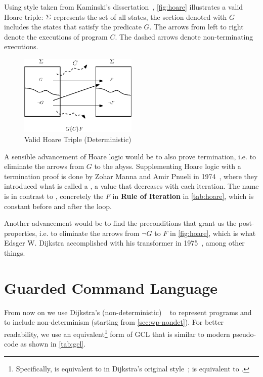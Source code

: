Using style taken from Kaminski's dissertation~\cite{kaminski19}, \autoref{fig:hoare} illustrates a valid Hoare triple: $\S$ represents the set of all states, the section denoted with $G$ includes the states that satisfy the predicate $G$. 
The arrows from left to right denote the executions of program $C$. 
The dashed arrows denote non-terminating executions. 

\begin{figure}[ht]\centering
\includegraphics[width=0.5\textwidth]{image/hoare.eps}
\caption{Valid Hoare Triple (Deterministic)}
\label{fig:hoare}
\end{figure}


A sensible advancement of Hoare logic would be to also prove termination, i.e. to eliminate the arrows from $G$ to the abyss.  
Supplementing Hoare logic with a termination proof is done by Zohar Manna and Amir Pnueli in 1974~\cite{manna74}, where they introduced what is called a , a value that decreases with each iteration. The name is in contrast to , concretely the $F$ in \textbf{Rule of Iteration} in \autoref{tab:hoare}, which is constant before and after the loop. 

Another advancement would be to find the  preconditions that grant us the post-properties, i.e. to eliminate the arrows from $\neg G$ to $F$ in \autoref{fig:hoare}, which  is what Edsger W. Dijkstra accomplished with his  transformer in 1975~\cite{dijkstra75}, among other things. 


\section{Guarded Command Language}\label{sec:gcl}
From now on we use Dijkstra's (non-deterministic) ~\cite{dijkstra75} to represent programs and to include non-determinism (starting from \autoref{sec:wp-nondet}).
For better readability, we use an equivalent\footnote{Specifically,   is equivalent to
 in Dijkstra's original style~\cite{dijkstra75};  is equivalent to .} 
form of GCL that is similar to modern pseudo-code as shown in \autoref{tab:gcl}. 


